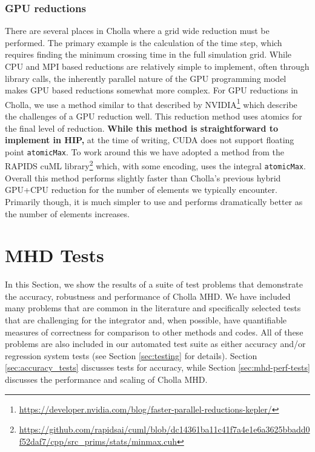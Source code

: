 \documentclass[modern, linenumbers]{aastex631}
\begin{document}
\subsubsection{GPU reductions}

There are several places in Cholla where a grid wide reduction must be performed. The primary example is the calculation of the time step, which requires finding the minimum crossing time in the full simulation grid. While CPU and MPI based reductions are relatively simple to implement, often through library calls, the inherently parallel nature of the GPU programming model makes GPU based reductions somewhat more complex. For GPU reductions in Cholla, we use a method similar to that described by NVIDIA\footnote{\url{https://developer.nvidia.com/blog/faster-parallel-reductions-kepler/}} which describe the challenges of a GPU reduction well. This reduction method uses atomics for the final level of reduction. \textbf{While this method is straightforward to implement in HIP,} at the time of writing, CUDA does not support floating point \texttt{atomicMax}. To work around this we have adopted a method from the RAPIDS cuML library\footnote{\url{https://github.com/rapidsai/cuml/blob/dc14361ba11c41f7a4e1e6a3625bbadd0f52daf7/cpp/src\_prims/stats/minmax.cuh}} which, with some encoding, uses the integral \texttt{atomicMax}. Overall this method performs slightly faster than Cholla's previous hybrid GPU+CPU reduction for the number of elements we typically encounter. Primarily though, it is much simpler to use and performs dramatically better as the number of elements increases.


\section{MHD Tests}
\label{sec:mhd-tests}

In this Section, we show the results of a suite of test problems that demonstrate the accuracy, robustness and performance of Cholla MHD. We have included many problems that are common in the literature and specifically selected tests that are challenging for the integrator and, when possible, have quantifiable measures of correctness for comparison to other methods and codes. All of these problems are also included in our automated test suite as either accuracy and/or regression system tests (see Section \ref{sec:testing} for details). Section \ref{sec:accuracy_tests} discusses tests for accuracy, while Section \ref{sec:mhd-perf-tests} discusses the performance and scaling of Cholla MHD.
\end{document}

